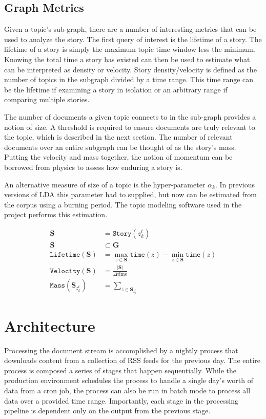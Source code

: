 \documentclass[10pt,twocolumn]{article}
\begin{document}
\subsection {Graph Metrics}

Given a topic's sub-graph, there are a number of interesting metrics that can be used to analyze the story. The first query of interest is the lifetime of a story.  The lifetime of a story is simply the maximum topic time window less the minimum.  Knowing the total time a story has existed can then be used to estimate what can be interpreted as density or velocity.  Story density/velocity is defined as the number of topics in the subgraph divided by a time range.  This time range can be the lifetime if examining a story in isolation or an arbitrary range if comparing multiple stories.  

The number of documents a given topic connects to in the sub-graph provides a notion of size.  A threshold is required to ensure documents are truly relevant to the topic, which is described in the next section.  The number of relevant documents over an entire subgraph can be thought of as the story's mass. Putting the velocity and mass together, the notion of momentum can be borrowed from physics to assess how enduring a story is. 

An alternative measure of size of a topic is the hyper-parameter $\alpha_k$.  In previous versions of LDA this parameter had to supplied, but now can be estimated from the corpus using a burning period.  The topic modeling software used in the project performs this estimation.

\begin{align}
\mathbf{S} & = \texttt{Story}(z_k^t) \\
\mathbf{S} &\subset \mathbf{G} \\
\texttt{Lifetime}(\mathbf{S}) &=\max_{z \in \mathbf{S}} \texttt{time}(z) - \min_{z \in \mathbf{S}}\texttt{time}(z) \\
\texttt{Velocity}(\mathbf{S}) &= \frac{|\mathbf{S}|}{\Delta \text{time}} \\
\texttt{Mass}(\mathbf{S}_{z_k^t}) &= \sum_{z \in \mathbf{S}_{z_k^t}}
\end{align}

\section {Architecture}

Processing the document stream is accomplished by a nightly process that downloads content from a collection of RSS feeds for the previous day.  The entire process is composed a series of stages that happen sequentially.  While the production environment schedules the process to handle a single day's worth of data from a cron job, the process can also be run in batch mode to process all data over a provided time range.  Importantly, each stage in the processing pipeline is dependent only on the output from the previous stage.
\end{document}
